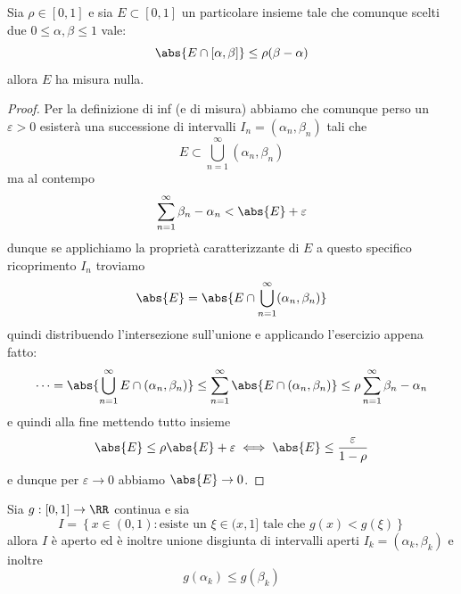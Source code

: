 \documentclass[11pt]{scrartcl}
\begin{document}
	 \begin{lemma}
	 	Sia $\rho\in [0,1]$ e sia $E\subset [0,1]$ un particolare insieme tale che comunque scelti due $0\le\alpha,\beta\le 1$ vale:
	 	$$\abs{E\cap [\alpha,\beta]}\le \rho(\beta-\alpha)$$
	 	allora $E$ ha misura nulla.
	 \end{lemma}
	 \begin{proof}
	 	Per la definizione di inf (e di misura) abbiamo che comunque perso un $\varepsilon>0$ esisterà una successione di intervalli $I_n=(\alpha_n,\beta_n)$ tali che 
	 	$$E\subset \bigcup_{n=1}^\infty (\alpha_n,\beta_n)$$
	 	ma al contempo
	 	$$\sum_{n=1}^\infty \beta_n-\alpha_n<\abs{E}+\varepsilon$$
	 	dunque se applichiamo la proprietà caratterizzante di $E$ a questo specifico ricoprimento $I_n$ troviamo
	 	$$\abs{E}=\abs{E\cap \bigcup_{n=1}^\infty (\alpha_n,\beta_n)}$$
	 	quindi distribuendo l'intersezione sull'unione e applicando l'esercizio appena fatto:
	 	$$\dots=\abs{\bigcup_{n=1}^\infty E\cap (\alpha_n,\beta_n)}\le \sum_{n=1}^\infty \abs{E\cap (\alpha_n,\beta_n)}\le \rho \sum_{n=1}^{\infty}\beta_n-\alpha_n$$
	 	e quindi alla fine mettendo tutto insieme
	 	$$\abs{E}\le \rho\abs{E}+\varepsilon\iff \abs{E}\le \frac{\varepsilon}{1-\rho}$$
	 	e dunque per $\varepsilon\to 0$ abbiamo $\abs{E}\to 0$. 
	 \end{proof}
	 \begin{lemma}
	 	Sia $g:[0,1]\to\RR$ continua e sia 
	 	$$I=\left\{x\in(0,1):\text{esiste un $\xi\in(x,1]$ tale che $g(x)<g(\xi)$}\right\}$$
	 	allora $I$ è aperto ed è inoltre unione disgiunta di intervalli aperti $I_k=(\alpha_k,\beta_k)$ e inoltre 
	 	$$g(\alpha_k)\le g(\beta_k)$$
	 \end{lemma}
\end{document}
